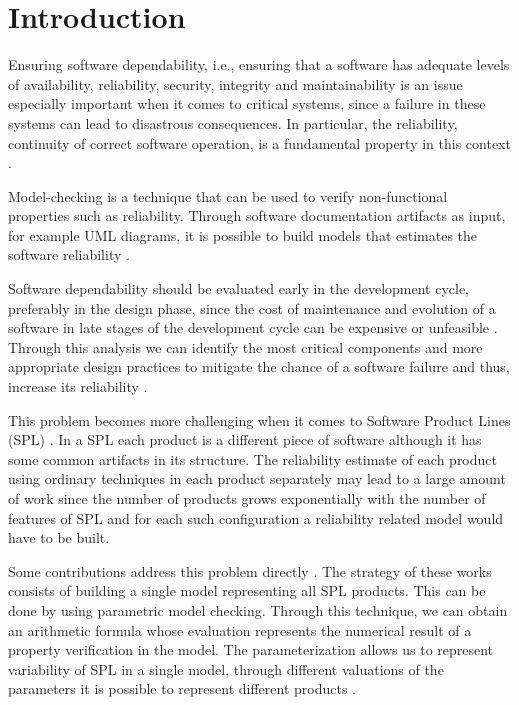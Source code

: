 \documentclass[conference]{IEEEtran}
\begin{document}
\section{Introduction}

	Ensuring software dependability, i.e., ensuring that a software has
	adequate levels of availability, reliability, security, integrity and maintainability
	is an issue especially important when it comes to critical systems,	since a failure in 
	these systems can lead to disastrous consequences. 
	In particular, the reliability, continuity of correct software operation,
	is a fundamental property in this context \cite{Avizienis}.
	
	Model-checking is a technique that can be used to verify non-functional properties such as 
	reliability. Through software documentation artifacts as input, for example UML diagrams,
	 it is possible to build models that estimates the software reliability \cite{JSS}.
	 	
	Software dependability should be evaluated early in the development cycle, preferably in the design phase,
	since the cost of maintenance and evolution of a software in late stages of the 
	development cycle can be expensive or unfeasible \cite{hoffman2008}. Through this analysis
	we can identify the most critical components and more appropriate design practices
	to mitigate the chance of a software failure and thus, increase its reliability \cite{JSS}.
	
	
	This problem becomes more challenging when it comes to Software Product Lines (SPL)  \cite{CLEMENTS01}.	 
	In a SPL each product is a different piece of software although it has some common artifacts in its structure.	
	The reliability estimate of each product using ordinary techniques in each product separately may lead to
	 a large amount of work since the number of products grows exponentially with the number of features of SPL
	 and for each such configuration a reliability related model would have to be built.
	
	  Some contributions address this problem directly \cite{Classen, classenlots, GhezziSPLC}. 
	The strategy of these works consists of building a single model 	representing all SPL products.
	This can be done by using parametric model checking. Through this technique, we can obtain an arithmetic formula whose evaluation
	represents the numerical result of a property verification in the model. The parameterization allows us to represent
	variability of SPL in a single model, through different valuations of the parameters it is possible
	to represent different products \cite{GhezziSPLC, paramthesis}.	
	
\end{document}
